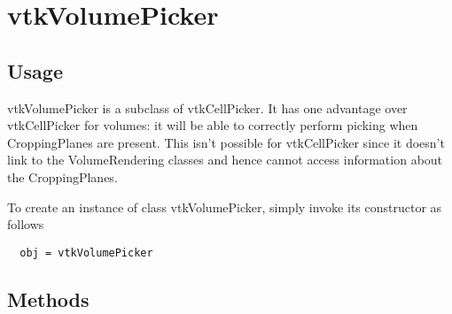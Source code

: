 \section{vtkVolumePicker}

\subsection{Usage}

 vtkVolumePicker is a subclass of vtkCellPicker.  It has one
 advantage over vtkCellPicker for volumes: it will be able to
 correctly perform picking when CroppingPlanes are present.  This
 isn't possible for vtkCellPicker since it doesn't link to
 the VolumeRendering classes and hence cannot access information
 about the CroppingPlanes.


To create an instance of class vtkVolumePicker, simply
invoke its constructor as follows
\begin{verbatim}
  obj = vtkVolumePicker
\end{verbatim}
\subsection{Methods}

